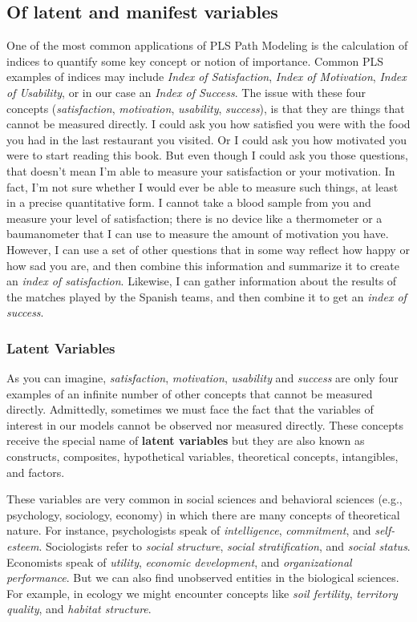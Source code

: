 \documentclass[12pt]{book}\usepackage{graphicx, color}
\begin{document}
\subsection{Of latent and manifest variables}
One of the most common applications of PLS Path Modeling is the calculation of indices to quantify some key concept or notion of importance. Common PLS examples of indices may include \textit{Index of Satisfaction}, \textit{Index of Motivation}, \textit{Index of Usability}, or in our case an \textit{Index of Success}. The issue with these four concepts (\textit{satisfaction}, \textit{motivation}, \textit{usability}, \textit{success}), is that they are things that cannot be measured directly. I could ask you how satisfied you were with the food you had in the last restaurant you visited. Or I could ask you how motivated you were to start reading this book. But even though I could ask you those questions, that doesn't mean I'm able to measure your satisfaction or your motivation. In fact, I'm not sure whether I would ever be able to measure such things, at least in a precise quantitative form. I cannot take a blood sample from you and measure your level of satisfaction; there is no device like a thermometer or a baumanometer that I can use to measure the amount of motivation you have. However, I can use a set of other questions that in some way reflect how happy or how sad you are, and then combine this information and summarize it to create an \textit{index of satisfaction}. Likewise, I can gather information about the results of the matches played by the Spanish teams, and then combine it to get an \textit{index of success}.


\subsubsection*{Latent Variables}
As you can imagine, \textit{satisfaction}, \textit{motivation}, \textit{usability} and \textit{success} are only four examples of an infinite number of other concepts that cannot be measured directly. Admittedly, sometimes we must face the fact that the variables of interest in our models cannot be observed nor measured directly. These concepts receive the special name of \textbf{latent variables} but they are also known as constructs, composites, hypothetical variables, theoretical concepts, intangibles, and factors.

These variables are very common in social sciences and behavioral sciences (e.g., psychology, sociology, economy) in which there are many concepts of theoretical nature. For instance, psychologists speak of \textit{intelligence}, \textit{commitment}, and \textit{self-esteem}. Sociologists refer to \textit{social structure}, \textit{social stratification}, and \textit{social status}. Economists speak of \textit{utility}, \textit{economic development}, and \textit{organizational performance}. But we can also find unobserved entities in the biological sciences. For example, in ecology we might encounter concepts like \textit{soil fertility}, \textit{territory quality}, and \textit{habitat structure}.
\end{document}
